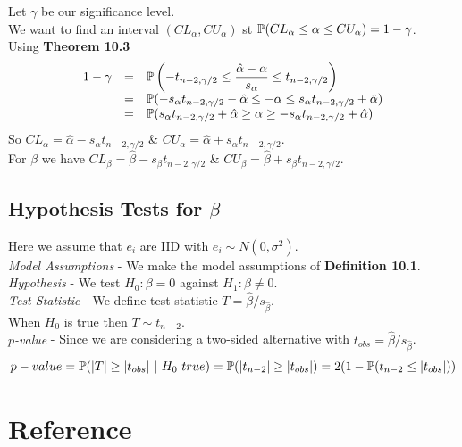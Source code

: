 \documentclass[11pt,a4paper]{article}
\begin{document}
Let $\gamma$ be our significance level.\\
We want to find an interval $(CL_\alpha,CU_\alpha)$ st $\mathbb{P}(CL_\alpha\leq\alpha\leq CU_\alpha)=1-\gamma$.\\
Using \textbf{Theorem 10.3}
\[\begin{array}{rcl}
1-\gamma&=&\mathbb{P}\left(-t_{n-2,\gamma/2}\leq\dfrac{\hat{\alpha}-\alpha}{s_\alpha}\leq t_{n-2,\gamma/2}\right)\\
&=&\mathbb{P}(-s_\alpha t_{n-2,\gamma/2}-\hat{\alpha}\leq-\alpha\leq s_\alpha t_{n-2,\gamma/2}+\hat{\alpha})\\
&=&\mathbb{P}(s_\alpha t_{n-2,\gamma/2}+\hat{\alpha}\geq\alpha\geq-s_\alpha t_{n-2,\gamma/2}+\hat{\alpha})
\end{array}\]
So $CL_\alpha=\hat{\alpha}-s_\alpha t_{n-2,\gamma/2}$ \& $CU_\alpha=\hat{\alpha}+s_\alpha t_{n-2,\gamma/2}$.\\
For $\beta$ we have $CL_\beta=\hat{\beta}-s_\beta t_{n-2,\gamma/2}$ \& $CU_\beta=\hat{\beta}+s_\beta t_{n-2,\gamma/2}$.\\

\subsection{Hypothesis Tests for $\beta$}

Here we assume that $e_i$ are IID with $e_i\sim N(0,\sigma^2)$.\\

\textit{Model Assumptions} - We make the model assumptions of \textbf{Definition 10.1}.\\
\textit{Hypothesis} - We test $H_0:\beta=0$ against $H_1:\beta\neq0$.\\
\textit{Test Statistic} - We define test statistic $T=\hat{\beta}/s_{\hat{\beta}}$.\\
When $H_0$ is true then $T\sim t_{n-2}$.\\
\textit{$p$-value} - Since we are considering a two-sided alternative with $t_{obs}=\hat{\beta}/s_{\hat{\beta}}$.
$$p-value=\prob(|T|\geq|t_{obs}|\ |\ H_0\ true)=\prob(|t_{n-2}|\geq|t_{obs}|)=2(1-\prob(t_{n-2}\leq|t_{obs}|))$$

\newpage
\setcounter{section}{-1}
\section{Reference}
\end{document}
